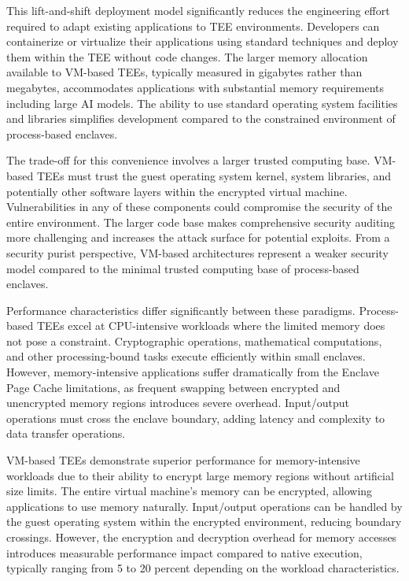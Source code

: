 This lift-and-shift deployment model significantly reduces the engineering effort required to adapt existing applications to TEE environments. Developers can containerize or virtualize their applications using standard techniques and deploy them within the TEE without code changes. The larger memory allocation available to VM-based TEEs, typically measured in gigabytes rather than megabytes, accommodates applications with substantial memory requirements including large AI models. The ability to use standard operating system facilities and libraries simplifies development compared to the constrained environment of process-based enclaves.

The trade-off for this convenience involves a larger trusted computing base. VM-based TEEs must trust the guest operating system kernel, system libraries, and potentially other software layers within the encrypted virtual machine. Vulnerabilities in any of these components could compromise the security of the entire environment. The larger code base makes comprehensive security auditing more challenging and increases the attack surface for potential exploits. From a security purist perspective, VM-based architectures represent a weaker security model compared to the minimal trusted computing base of process-based enclaves.

Performance characteristics differ significantly between these paradigms. Process-based TEEs excel at CPU-intensive workloads where the limited memory does not pose a constraint. Cryptographic operations, mathematical computations, and other processing-bound tasks execute efficiently within small enclaves. However, memory-intensive applications suffer dramatically from the Enclave Page Cache limitations, as frequent swapping between encrypted and unencrypted memory regions introduces severe overhead. Input/output operations must cross the enclave boundary, adding latency and complexity to data transfer operations.

VM-based TEEs demonstrate superior performance for memory-intensive workloads due to their ability to encrypt large memory regions without artificial size limits. The entire virtual machine's memory can be encrypted, allowing applications to use memory naturally. Input/output operations can be handled by the guest operating system within the encrypted environment, reducing boundary crossings. However, the encryption and decryption overhead for memory accesses introduces measurable performance impact compared to native execution, typically ranging from 5 to 20 percent depending on the workload characteristics.


